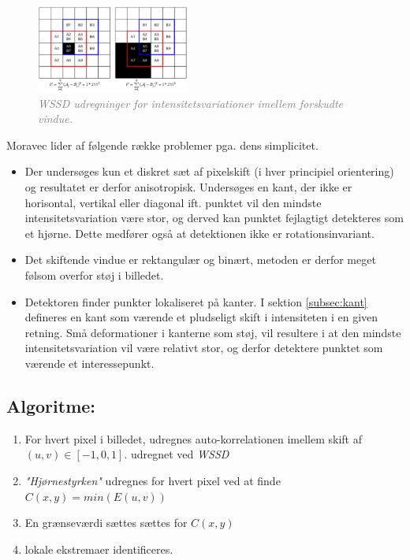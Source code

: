 \begin{figure}[H]
    \centering
    \includegraphics[width=0.45\textwidth]{fig/25.png}
     \vspace{-1em}
    \begin{center}    
       \caption{\textcolor{gray}{\footnotesize \textit{ WSSD udregninger for intensitetsvariationer imellem forskudte vindue. }}}
    \label{fig:moravec}
     \end{center}
     \vspace{-2.5em}
  \end{figure} \noindent
Moravec lider af følgende række problemer pga. dens simplicitet. 
\begin{itemize}
\item{ Der undersøges kun et diskret sæt af pixelskift (i hver principiel orientering) og resultatet er derfor anisotropisk. Undersøges en kant, der ikke er horisontal, vertikal eller diagonal ift. punktet vil den mindste intensitetsvariation være stor, og derved kan punktet fejlagtigt detekteres som et hjørne. Dette medfører også at detektionen ikke er rotationsinvariant.}
\item{Det skiftende vindue er rektangulær og binært, metoden er derfor meget følsom overfor støj i billedet.}
\item{Detektoren finder punkter lokaliseret på kanter. I sektion \ref{subsec:kant} defineres en kant som værende et pludseligt skift i intensiteten i en given retning. Små deformationer i kanterne som støj, vil resultere i at den mindste intensitetsvariation vil være relativt stor, og derfor detektere punktet som værende et interessepunkt.}
\end{itemize}
\subsection*{Algoritme:}
\begin{enumerate}
\item{For hvert pixel i billedet, udregnes auto-korrelationen imellem skift af $(u,v) \in [-1,0,1]$. udregnet ved \textit{WSSD} }
\item{\textit{"Hjørnestyrken"} udregnes for hvert pixel ved at finde $C(x,y)=min(E(u,v))$ }
\item{ En grænseværdi sættes sættes for $C(x,y)$}
\item{lokale ekstremaer identificeres. }
\end{enumerate}
